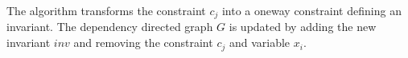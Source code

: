 The algorithm transforms the constraint $c_j$ into a oneway constraint defining an invariant. The dependency directed 
graph $G$ is updated by adding the new invariant $inv$ and removing the constraint $c_j$ and variable $x_i$. \medskip 
\\






